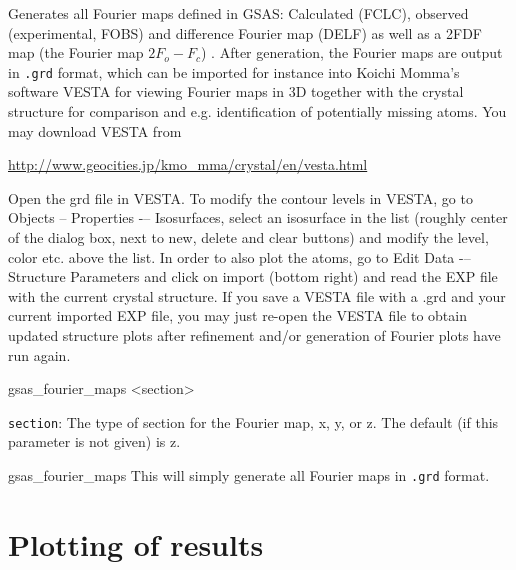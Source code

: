 {
Generates all Fourier maps defined in GSAS: Calculated (FCLC), observed (experimental, FOBS) and difference Fourier map (DELF) as well as a 2FDF map (the Fourier map $2F_o-F_c$) . After generation, the Fourier maps are output in \texttt{.grd} format, which can be imported for instance into Koichi Momma's software VESTA for viewing Fourier maps in 3D together with the crystal structure for comparison and e.g. identification of potentially missing atoms. You may download VESTA from

\url{http://www.geocities.jp/kmo_mma/crystal/en/vesta.html}

Open the grd file in VESTA. To modify the contour levels in VESTA, go to Objects -- Properties -– Isosurfaces, select an isosurface in the list (roughly center of the dialog box, next to new, delete and clear buttons) and modify the level, color etc. above the list. In order to also plot the atoms, go to Edit Data -– Structure Parameters and click on import (bottom right) and read the EXP file with the current crystal structure. If you save a VESTA file with a .grd and your current imported EXP file, you may just re-open the VESTA file to obtain updated structure plots after refinement and/or generation of Fourier plots have run again.
}{
gsas\_fourier\_maps <section>
}{
\item \texttt{section}: The type of section for the Fourier map, x, y, or z. The default (if this parameter is not given) is z.
}{
gsas\_fourier\_maps
}{
This will simply generate all Fourier maps in \texttt{.grd} format.
}

\section{Plotting of results}


